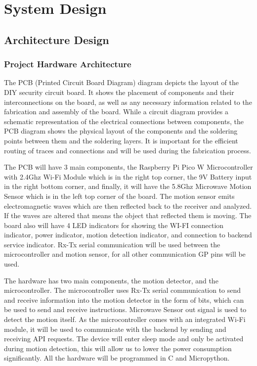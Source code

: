 \section{System Design}\label{sec:system-design}

\subsection{Architecture Design}\label{subsec:architecture-design}

\subsubsection{Project Hardware Architecture}


The PCB (Printed Circuit Board Diagram) diagram depicts the layout of the DIY security
circuit board. %
It shows the placement of components and their interconnections on the board, as well as any necessary information related to the fabrication and assembly of
the board. %
While a circuit diagram provides a schematic representation of the electrical connections between components, the PCB diagram shows the physical layout of the
components and the soldering points between them and the soldering layers. %
It is
important for the efficient routing of traces and connections and will be used during
the fabrication process. %

The PCB will have 3 main components, the Raspberry Pi Pico W Microcontroller with
2.4Ghz Wi-Fi Module which is in the right top corner, the 9V Battery input in the
right bottom corner, and finally, it will have the 5.8Ghz Microwave Motion Sensor
which is in the left top corner of the board. %
The motion sensor emits electromagnetic waves which are then reflected back to the receiver and analyzed. %
If the waves are altered that means the object that reflected them is moving. %
The board also will have 4 LED indicators for showing the WI-FI connection indicator, power indicator,
motion detection indicator, and connection to backend service indicator. %
Rx-Tx serial communication will be used between the microcontroller and motion sensor,
for all other communication GP pins will be used. %

The hardware has two main components, the motion detector, and the microcontroller. %
The microcontroller uses Rx-Tx serial communication to send and receive information
into the motion detector in the form of bits, which can be used to send and receive
instructions. %
Microwave Sensor out signal is used to detect the motion itself. %
As the microcontroller comes with an integrated Wi-Fi module, it will be used to communicate with the backend by sending and receiving API requests.
The device will enter sleep mode and only be activated during motion detection,
this will allow us to lower the power consumption significantly. %
All the hardware will be programmed in C and Micropython. %

